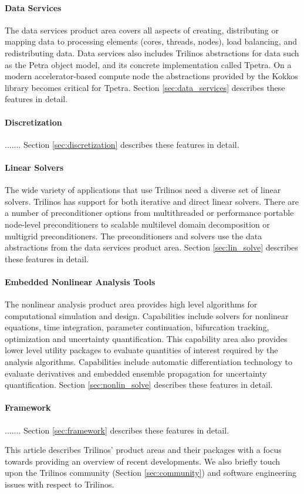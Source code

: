 \paragraph{Data Services} The data services product area covers all aspects of creating, distributing or mapping data to processing elements (cores, threads, nodes), load balancing, and redistributing data. Data services also includes Trilinos abstractions for data such as the Petra object model, and its concrete implementation called Tpetra. On a modern accelerator-based compute node the abstractions provided by the Kokkos library becomes critical for Tpetra. Section \ref{sec:data_services} describes these features in detail.
 
\paragraph{Discretization}  ....... Section \ref{sec:discretization} describes these features in detail.


\paragraph{Linear Solvers} The wide variety of applications that use Trilinos need a diverse set of linear solvers. Trilinos has support for both iterative and direct linear solvers. There are a number of preconditioner options from multithreaded or performance portable node-level preconditioners to scalable multilevel domain decomposition or multigrid preconditioners. The preconditioners and solvers use the data abstractions from the data services product area. Section \ref{sec:lin_solve} describes these features in detail.

\paragraph{Embedded Nonlinear Analysis Tools} The nonlinear analysis product area provides high level algorithms for computational simulation and design. Capabilities include solvers for nonlinear equations, time integration, parameter continuation, bifurcation tracking, optimization and uncertainty quantification. This capability area also provides lower level utility packages to evaluate quantities of interest required by the analysis algorithms. Capabilities include automatic differentiation technology to evaluate derivatives and embedded ensemble propagation for uncertainty quantification. Section \ref{sec:nonlin_solve} describes these features in detail.

\paragraph{Framework}  ....... Section \ref{sec:framework} describes these features in detail.

This article describes Trilinos' product areas and their packages with a focus towards providing an overview of recent developments. We also briefly touch upon the Trilinos community (Section \ref{sec:community}) and software engineering issues with respect to Trilinos.

